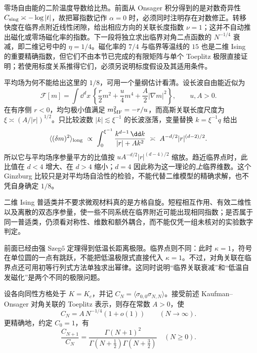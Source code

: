 零场自由能的二阶温度导数给比热。前面从 Onsager 积分得到的是对数奇异性 \(C_{\rm sing}\asymp-\log|t|\)，故把幂指数记作 \(\alpha=0\) 时，必须同时注明存在对数修正。转移快度在临界点附近线性闭隙，给出相应方向的关联长度指数 \(\nu=1\)；这并不自动推出磁化或零场磁化率的指数。下一段将独立求出临界对角二点函数的 \(N^{-1/4}\) 衰减，即二维记号中的 \(\eta=1/4\)。磁化率的 \(7/4\) 与临界等温线的 \(15\) 也是二维 Ising 的重要精确指数，但它们不由本节已完成的有限矩阵与单个 Toeplitz 极限直接证明；若使用标度关系推得它们，必须另说明标度假设及其适用条件。

平均场为何不能给出这里的 \(1/8\)，可用一个量纲估计看清。设长波自由能近似为
\[
\mathcal F[m]=\int\dd^dx\,
\left\{\frac r2m^2+\frac u4m^4
+\frac A2|\nabla m|^2\right\},\qquad u,A>0.
\]
在有序侧 \(r<0\)，均匀极小值满足 \(m_{\rm MF}^2=-r/u\)，而高斯关联长度尺度为 \(\xi\asymp(A/|r|)^{1/2}\)。只比较波数 \(|k|\lesssim\xi^{-1}\) 的长波涨落，变量替换 \(k=\xi^{-1}q\) 给出
\[
\langle(\delta m)^2\rangle_{\rm long}
\ \propto\ \int_0^{\xi^{-1}}
\frac{k^{d-1}\,\dd k}{|r|+Ak^2}
\ \asymp\ A^{-d/2}|r|^{(d-2)/2}.
\]
所以它与平均场序参量平方的比值按
\(uA^{-d/2}|r|^{(d-4)/2}\) 缩放。趋近临界点时，此比值在 \(d<4\) 增大、在 \(d>4\) 缩小；\(d=4\) 因此称为这一理论的\emph{上}临界维数。这个 Ginzburg 比较只是对平均场自洽性的检验，不能代替二维模型的精确求解，也不凭自身确定 \(1/8\)。

二维 Ising 普适类并不要求微观材料真的是方格自旋。短程相互作用、有效二维性以及离散的双态序参量，使一些不同系统在临界附近可能出现相同指数；是否属于同一普适类，仍须看对称性、维数和额外耦合，而不能仅凭一组未核对的实验数字判定。

前面已经由强 Szeg\H{o} 定理得到低温长距离极限。临界点则不同：此时 \(\kappa=1\)，符号在单位圆的一点有跳跃，不能把低温极限式直接代入 \(\kappa=1\)。不过，对角关联在临界点还可用初等行列式方法单独求出幂律。这同时说明“临界关联衰减”和“低温自发磁化”是两个不同的极限问题。

\begin{theorem}[临界对角关联的幂律]
设各向同性方格处于 \(K=K_c\)，并记
\(C_N=\langle\sigma_{0,0}\sigma_{N,N}\rangle\)。接受前述 Kaufman--Onsager 对角关联的 Toeplitz 表示，则存在常数 \(A>0\)，使
\[
C_N=A\,N^{-1/4}(1+o(1))\qquad(N\to\infty).
\]
更精确地，约定 \(C_0=1\)，有
\begin{equation}
\frac{C_{N+1}}{C_N}
=\frac{\Gamma(N+1)^2}
{\Gamma(N+\tfrac12)\Gamma(N+\tfrac32)}
\quad(N\ge0).
\label{eq:phys-sm-critical-diagonal-ratio}
\end{equation}
\end{theorem}

